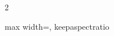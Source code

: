 \begin{multicols}{2}
\begin{center}
\begin{adjustbox}{max width=\linewidth, keepaspectratio}
        \end{adjustbox}
        \label{fig:60CoKaskadenEnergiewindowBeiPeak2}
    \end{center}
\endminipage
%
\end{multicols}
%
